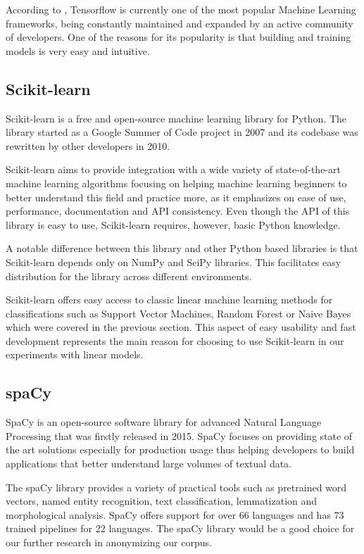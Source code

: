 \documentclass[12pt,a4paper]{report}
\begin{document}
According to \citet{mlFrameworks}, Tensorflow is currently one of the most popular Machine Learning frameworks, being constantly maintained and expanded by an active community of developers. One of the reasons for its popularity is that building and training models is very easy and intuitive.

\subsection{Scikit-learn}
Scikit-learn \citep{scikit-learn} is a free and open-source machine learning library for Python. The library started as a Google Summer of Code project in 2007 and its codebase was rewritten by other developers in 2010.

Scikit-learn aims to provide integration with a wide variety of state-of-the-art machine learning algorithms focusing on helping machine learning beginners to better understand this field and practice more, as it emphasizes on ease of use, performance, documentation and API consistency. Even though the API of this library is easy to use, Scikit-learn requires, however, basic Python knowledge.

A notable difference between this library and other Python based libraries is that Scikit-learn depends only on NumPy and SciPy libraries. This facilitates easy distribution for the library across  different environments.

Scikit-learn offers easy access to classic linear machine learning methods for classifications such as Support Vector Machines, Random Forest or Naive Bayes which were covered in the previous section. This aspect of easy usability and fast development represents the main reason for choosing to use Scikit-learn in our experiments with linear models.

\subsection{spaCy}
SpaCy \citep{spacy} is an open-source software library for advanced Natural Language Processing that was firstly released in 2015. SpaCy focuses on providing state of the art solutions especially for production usage thus helping developers to build applications that better understand large volumes of textual data.

The spaCy library provides a variety of practical tools such as pretrained word vectors, named entity recognition, text classification, lemmatization and morphological analysis. SpaCy offers support for over 66 languages and has 73 trained pipelines for 22 languages. The spaCy library would be a good choice for our further research in anonymizing our corpus.
\end{document}
